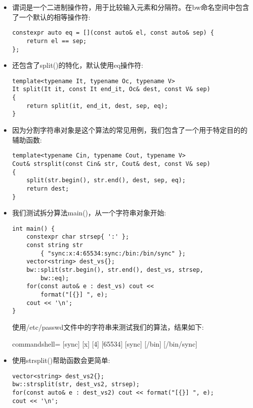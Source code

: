 \begin{itemize}
\item 
谓词是一个二进制操作符，用于比较输入元素和分隔符。在bw命名空间中包含了一个默认的相等操作符:

\begin{lstlisting}[style=styleCXX]
constexpr auto eq = [](const auto& el, const auto& sep) {
	return el == sep;
};
\end{lstlisting}

\item 
还包含了split()的特化，默认使用eq操作符:

\begin{lstlisting}[style=styleCXX]
template<typename It, typename Oc, typename V>
It split(It it, const It end_it, Oc& dest, const V& sep)
{
	return split(it, end_it, dest, sep, eq);
}
\end{lstlisting}

\item 
因为分割字符串对象是这个算法的常见用例，我们包含了一个用于特定目的的辅助函数:

\begin{lstlisting}[style=styleCXX]
template<typename Cin, typename Cout, typename V>
Cout& strsplit(const Cin& str, Cout& dest, const V& sep)
{
	split(str.begin(), str.end(), dest, sep, eq);
	return dest;
}
\end{lstlisting}

\item 
我们测试拆分算法main()，从一个字符串对象开始:

\begin{lstlisting}[style=styleCXX]
int main() {
	constexpr char strsep{ ':' };
	const string str
		{ "sync:x:4:65534:sync:/bin:/bin/sync" };
	vector<string> dest_vs{};
	bw::split(str.begin(), str.end(), dest_vs, strsep,
		bw::eq);
	for(const auto& e : dest_vs) cout <<
		format("[{}] ", e);
	cout << '\n';
}
\end{lstlisting}

使用/etc/passwd文件中的字符串来测试我们的算法，结果如下:

\begin{tcblisting}{commandshell={}}
[sync] [x] [4] [65534] [sync] [/bin] [/bin/sync]
\end{tcblisting}

\item 
使用strsplit()帮助函数会更简单:

\begin{lstlisting}[style=styleCXX]
vector<string> dest_vs2{};
bw::strsplit(str, dest_vs2, strsep);
for(const auto& e : dest_vs2) cout << format("[{}] ", e);
cout << '\n';
\end{lstlisting}


\end{itemize}

